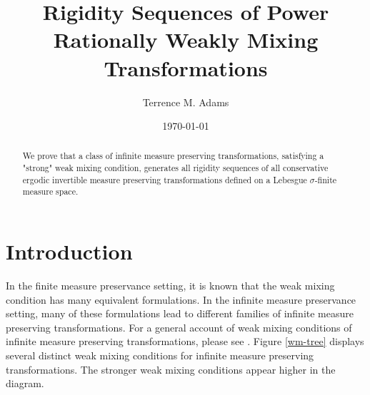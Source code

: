 \documentclass[12pt]{amsart}
\title[Rigidity Sequences for PRWM Transformations]{Rigidity Sequences of Power Rationally Weakly Mixing Transformations}
\author[T. M. Adams]{Terrence M. Adams}
\date{\today}
\begin{document}
\begin{abstract} 
We prove that a class of infinite measure preserving transformations, 
satisfying a "strong" weak mixing condition, generates all rigidity sequences 
of all conservative ergodic invertible measure preserving transformations 
defined on a Lebesgue $\sigma$-finite measure space. 
\end{abstract}


\maketitle

\section{Introduction}
In the finite measure preservance setting, it is known that the 
weak mixing condition has many equivalent formulations. 
In the infinite measure preservance setting, many of these 
formulations lead to different families 
of infinite measure preserving transformations. 
For a general account of weak mixing conditions 
of infinite measure preserving transformations, 
please see \cite{Aa77,Aar97,Aar13,BayYan14,Dai14,DGMS}. 
Figure \ref{wm-tree} displays several distinct weak mixing 
conditions for infinite measure preserving transformations. 
The stronger weak mixing conditions appear higher in the diagram. 
\end{document}
